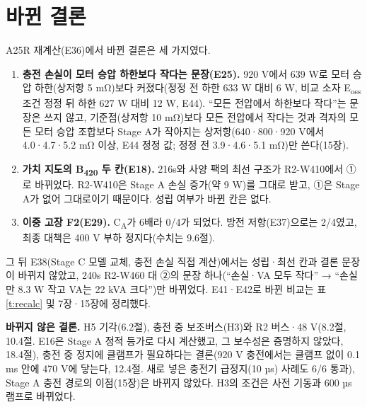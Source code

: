 
\section{바뀐 결론}

A25R 재계산(E36)에서 바뀐 결론은 세 가지였다.

\begin{enumerate}[label=(\arabic*)]
\item \textbf{충전 손실이 모터 승압 하한보다 작다는 문장(E25).} 920 V에서 639 W로 모터 승압 하한(상저항 5 mΩ)보다 커졌다(정정 전 하한 633 W 대비 6 W, 비교 소자 E\textsubscript{oss} 조건 정정 뒤 하한 627 W 대비 12 W, E44). “모든 전압에서 하한보다 작다”는 문장은 쓰지 않고, 기준점(상저항 10 mΩ)보다 모든 전압에서 작다는 것과 격자의 모든 모터 승압 조합보다 Stage A가 작아지는 상저항(640·800·920 V에서 4.0·4.7·5.2 mΩ 이상, E44 정정 값; 정정 전 3.9·4.6·5.1 mΩ)만 쓴다(15장).
\item \textbf{가치 지도의 B\textsubscript{420} 두 칸(E18).} 216s와 사양 팩의 최선 구조가 R2-W410에서 ①로 바뀌었다. R2-W410은 Stage A 손실 증가(약 9 W)를 그대로 받고, ①은 Stage A가 없어 그대로이기 때문이다. 성립 여부가 바뀐 칸은 없다.
\item \textbf{이중 고장 F2(E29).} C\textsubscript{A}가 6배라 0/4가 되었다. 방전 저항(E37)으로는 2/4였고, 최종 대책은 400 V 부하 정지다(수치는 9.6절).
\end{enumerate}

그 뒤 E38(Stage C 모델 교체, 충전 손실 직접 계산)에서는 성립·최선 칸과 결론 문장이 바뀌지 않았고, 240s R2-W460 대 ②의 문장 하나(“손실·VA 모두 작다” → “손실만 8.3 W 작고 VA는 22 kVA 크다”)만 바뀌었다. E41·E42로 바뀐 비교는 표 \ref{t:recalc} 및 7장·15장에 정리했다.


\textbf{바뀌지 않은 결론.} H5 기각(6.2절), 충전 중 보조버스(H3)와 R2 버스·48 V(8.2절, 10.4절. E16은 Stage A 정적 등가로 다시 계산했고, 그 보수성은 증명하지 않았다, 18.4절), 충전 중 정지에 클램프가 필요하다는 결론(920 V 충전에서는 클램프 없이 0.1 ms 안에 470 V에 닿는다, 12.4절. 새로 넣은 충전기 급정지(10 µs) 사례도 6/6 통과), Stage A 충전 경로의 이점(15장)은 바뀌지 않았다. H3의 조건은 사전 기동과 600 µs 램프로 바뀌었다.
